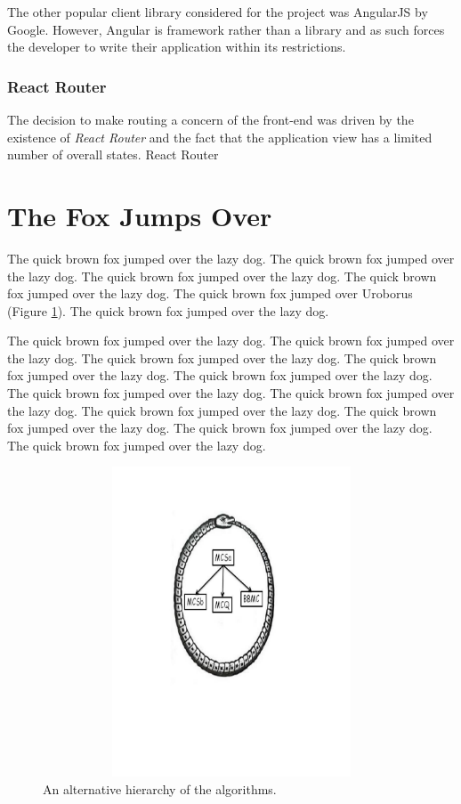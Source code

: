 \documentclass{l4proj}
\begin{document}
        The other popular client library considered for the project was AngularJS by Google. However, Angular is framework rather than a library and as such forces the developer to write their application within its restrictions.

        \subsubsection{React Router}
        The decision to make routing a concern of the front-end was driven by the existence of \textit{React Router} and the fact that the application view has a limited number of overall states. React Router




\section{The Fox Jumps Over}
The quick brown fox jumped over the lazy dog.
The quick brown fox jumped over the lazy dog.
The quick brown fox jumped over the lazy dog.
The quick brown fox jumped over the lazy dog.
The quick brown fox jumped over Uroborus (Figure \ref{uroborus}).
The quick brown fox jumped over the lazy dog.

The quick brown fox jumped over the lazy dog.
The quick brown fox jumped over the lazy dog.
The quick brown fox jumped over the lazy dog.
The quick brown fox jumped over the lazy dog.
The quick brown fox jumped over the lazy dog.
The quick brown fox jumped over the lazy dog.
The quick brown fox jumped over the lazy dog.
The quick brown fox jumped over the lazy dog.
The quick brown fox jumped over the lazy dog.
The quick brown fox jumped over the lazy dog.
The quick brown fox jumped over the lazy dog.

\begin{figure}
\centering
\includegraphics[height=9.2cm,width=13.2cm]{uroboros.pdf}
\vspace{-30mm}
\caption{An alternative hierarchy of the algorithms.}
\label{uroborus}
\end{figure}
\end{document}

